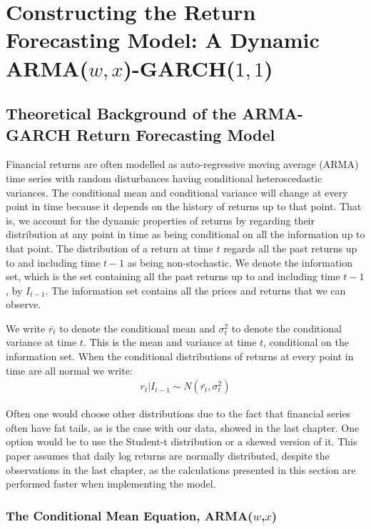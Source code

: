 \section{Constructing the Return Forecasting Model: A Dynamic ARMA($w,x$)-GARCH($1,1$)} 


\subsection{Theoretical Background of the ARMA-GARCH Return Forecasting Model}

Financial returns are often modelled as auto-regressive moving average (ARMA) time series with random disturbances having conditional heteroscedastic variances. The conditional mean and conditional variance will change at every point in time because it depends on the history of returns up to that point. That is, we account for the dynamic properties of returns by regarding their distribution at any point in time as being conditional on all the information up to that point. The distribution of a return at time $t$ regards all the past returns up to and including time $t-1$ as being non-stochastic. We denote the information set, which is the set containing all the past returns up to and including time $t-1$, by $I_{t-1}$. The information set contains all the prices and returns that we can observe.

We write $\bar{r_t}$ to denote the conditional mean and $\sigma_t^2$ to denote the conditional variance at time $t$. This is the mean and variance at time $t$, conditional on the information set. When the conditional distributions of returns at every point in time are all normal we write:
\begin{align}
    r_t | I_{t-1} \sim N(\bar{r_t},{\sigma_t^2})
\end{align}

Often one would choose other distributions due to the fact that financial series often have fat tails, as is the case with our data, showed in the last chapter. One option would be to use the Student-t distribution or a skewed version of it. This paper assumes that daily log returns are normally distributed, despite the observations in the last chapter, as the calculations presented in this section are performed faster when implementing the model.

\subsubsection{The Conditional Mean Equation, ARMA($w$,$x$)}

